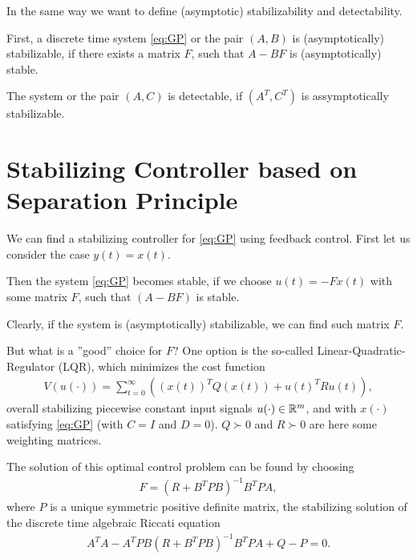 In the same way we want to define (asymptotic) stabilizability and detectability. 

First, a discrete time system \eqref{eq:GP} or the pair $(A, B)$ is (asymptotically) stabilizable, if there exists a matrix $F$, such that $A - BF$ is (asymptotically) stable.

The system or the pair $(A,C)$ is detectable, if $(A^T, C^T)$ is assymptotically stabilizable. 



\section{Stabilizing Controller based on Separation Principle}
\label{sch:stabilizingController}



We can find a stabilizing controller for \eqref{eq:GP} using feedback control.
First let us consider the case $y(t) = x(t)$.

%
%

Then the system \eqref{eq:GP} becomes stable, if we choose $u(t) = -Fx(t)$ with some matrix $F$, such that $(A - BF)$ is stable.

Clearly, if the system is (asymptotically) stabilizable, we can find such matrix $F$. 

But what is a ''good'' choice for $F$? One option is the so-called Linear-Quadratic-Regulator (LQR), which minimizes the cost function 
\begin{align}
\label{eq:costFcn}
V(u(\cdot)) = \sum_{t = 0}^\infty \left( (x(t))^T Q (x(t)) + u(t)^T R u(t)\right),
\end{align}
overall stabilizing piecewise constant input signals $u(\cdot) \in {\mathbb{R}}^m$, and with $x(\cdot)$ satisfying \eqref{eq:GP} (with $C = I$ and $D = 0$). 
$Q \succ 0$ and $R \succ 0$ are here some weighting matrices. 

The solution of this optimal control problem can be found by choosing 
\begin{align}
F = (R + B^T P B)^{-1}B^TPA,
\end{align}
where $P$ is a unique symmetric positive definite matrix, the stabilizing solution of the discrete time algebraic Riccati equation
\begin{align}
 A^TA - A^T P B (R + B^T P B)^{-1} B^T P A + Q - P = 0.%
\end{align}




